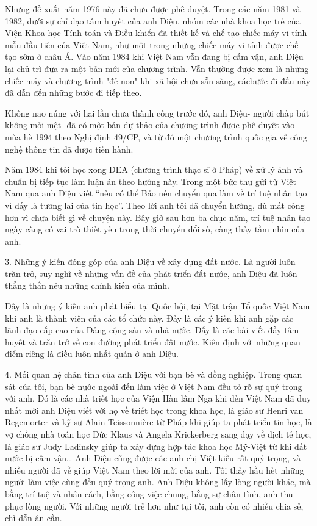 Nhưng đề xuất năm 1976 này đã chưa được phê duyệt. Trong các năm 1981 và 1982, dưới sự chỉ đạo tâm huyết của anh Diệu, nhóm các nhà khoa học trẻ của Viện Khoa học Tính toán và Điều khiển đã thiết kế và chế tạo chiếc máy vi tính mẫu đầu tiên của Việt Nam, như một trong những chiếc máy vi tính được chế tạo sớm ở châu Á. Vào năm 1984 khi Việt Nam vẫn đang bị cấm vận, anh Diệu lại chủ trì đưa ra một bản mới của chương trình. Vẫn thường được xem là những chiếc máy và chương trình "đẻ non" khi xã hội chưa sẵn sàng, cácbước đi đầu này đã dẫn đến những bước đi tiếp theo.

Không nao núng với hai lần chưa thành công trước đó, anh Diệu- người chấp bút không mỏi mệt- đã có một bản dự thảo của chương trình được phê duyệt vào mùa hè 1994 theo Nghị định 49/CP, và từ đó một chương trình quốc gia về công nghệ thông tin đã được tiến hành.

Năm 1984 khi tôi học xong DEA (chương trình thạc sĩ ở Pháp) về xử lý ảnh và chuẩn bị tiếp tục làm luận án theo hướng này. Trong một bức thư gửi từ Việt Nam qua anh Diệu viết “nếu có thể Bảo nên chuyển qua làm về trí tuệ nhân tạo vì đấy là tương lai của tin học”. Theo lời anh tôi đã chuyển hướng, dù mất công hơn vì chưa biết gì về chuyện này. Bây giờ sau hơn ba chục năm, trí tuệ nhân tạo ngày càng có vai trò thiết yếu trong thời chuyển đổi số, càng thấy tầm nhìn của anh.

3. Những ý kiến đóng góp của anh Diệu về xây dựng đất nước. Là người luôn trăn trở, suy nghĩ về những vấn đề của phát triển đất nước, anh Diệu đã luôn thẳng thắn nêu những chính kiến của mình.

Đấy là những ý kiến anh phát biểu tại Quốc hội, tại Mặt trận Tổ quốc Việt Nam khi anh là thành viên của các tổ chức này. Đấy là các ý kiến khi anh gặp các lãnh đạo cấp cao của Đảng cộng sản và nhà nước. Đấy là các bài viết đầy tâm huyết và trăn trở về con đường phát triển đất nước. Kiên định với những quan điểm riêng là điều luôn nhất quán ở anh Diệu.

4. Mối quan hệ chân tình của anh Diệu với bạn bè và đồng nghiệp. Trong quan sát của tôi, bạn bè nước ngoài đến làm việc ở Việt Nam đều tỏ rõ sự quý trọng với anh. Đó là các nhà triết học của Viện Hàn lâm Nga khi đến Việt Nam đã duy nhất mời anh Diệu viết với họ về triết học trong khoa học, là giáo sư Henri van Regemorter và kỹ sư Alain Teissonnière từ Pháp khi giúp ta phát triển tin học, là vợ chồng nhà toán học Đức Klaus và Angela Krickerberg sang dạy về dịch tễ học, là giáo sư Judy Ladinsky giúp ta xây dựng hợp tác khoa học Mỹ-Việt từ khi đất nước bị cấm vận… Anh Diệu cũng được các anh chị Việt kiều rất quý trọng, và nhiều người đã về giúp Việt Nam theo lời mời của anh. Tôi thấy hầu hết những người làm việc cùng đều quý trọng anh. Anh Diệu không lấy lòng người khác, mà bằng trí tuệ và nhân cách, bằng công việc chung, bằng sự chân tình, anh thu phục lòng người. Với những người trẻ hơn như tụi tôi, anh còn có nhiều chia sẻ, chỉ dẫn ân cần.

